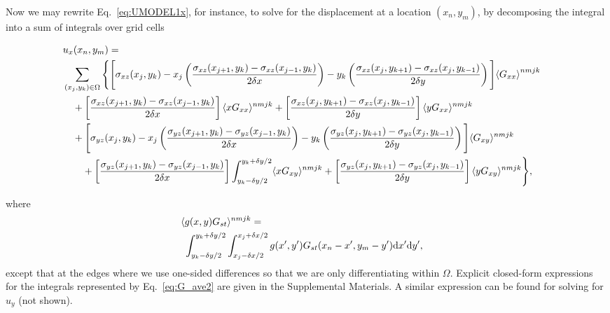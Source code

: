\documentclass[aps,prl,reprint,twocolumn,groupedaddress,showpacs]{revtex4-1}
\def\dd{\mbox{d}}
\begin{document}
Now we may rewrite Eq.~\ref{eq:UMODEL1x}, for instance, to solve for the displacement at a location $(x_n,y_m)$, by decomposing the integral into a sum of integrals over grid cells
%
\begin{widetext}
\begin{align}
 \lefteqn{u_x(x_n,y_m) =} \nonumber\\
 & \sum_{(x_j,y_k)\in\Omega} \Bigg\{ \Bigg[\sigma_{xz}(x_j,y_k)  - x_j\left(\frac{\sigma_{xz}(x_{j+1},y_k) - \sigma_{xz}(x_{j-1},y_k) }{2\delta x }    \right)    -y_k\left( \frac{\sigma_{xz}(x_j,y_{k+1}) -  \sigma_{xz}(x_j,y_{k-1}) }{2\delta y}\right) \Bigg]{ \langle G_{xx} \rangle}^{nmjk} \nonumber \\
&\quad+\left[ \frac{\sigma_{xz}(x_{j+1},y_k) -  \sigma_{xz}(x_{j-1},y_k) }{2\delta x}   \right]\langle xG_{xx} \rangle^{nmjk} + \left[  \frac{\sigma_{xz}(x_j,y_{k+1}) - \sigma_{xz}(x_j,y_{k-1}) }{2\delta y} \right] \langle yG_{xx} \rangle^{nmjk}\nonumber\\
&\quad+  \Bigg[\sigma_{yz}(x_j,y_k) -x_j\left(\frac{\sigma_{yz}(x_{j+1},y_k) - \sigma_{yz}(x_{j-1},y_k) }{2\delta x}    \right)    -y_k\left( \frac{\sigma_{yz}(x_j,y_{k+1}) - \sigma_{yz}(x_j,y_{k-1}) }{2\delta y}\right) \Bigg] \langle G_{xy} \rangle^{nmjk}\nonumber \\
&\qquad +\left[ \frac{\sigma_{yz}(x_{j+1},y_k) -  \sigma_{yz}(x_{j-1},y_k) }{2\delta x}   \right]  \int_{y_k-\delta y/2}^{y_k+\delta y/2}  \langle xG_{xy} \rangle^{nmjk} + \left[  \frac{\sigma_{yz}(x_j,y_{k+1}) - \sigma_{yz}(x_j,y_{k-1}) }{2\delta y} \right] \langle yG_{xy} \rangle^{nmjk} \Bigg\},
\label{eq:ux_decomposed}
\end{align}
\end{widetext}
where
\begin{align}
\lefteqn{\langle g(x,y)G_{st} \rangle^{nmjk} =}  \nonumber\\
&\  \int_{y_k-\delta y/2}^{y_k+\delta y/2} \int_{x_j-\delta x/2}^{x_j+\delta x/2} g(x',y')G_{st}(x_n-x',y_m-y') \dd x' \dd y', \label{eq:G_ave2} 
\end{align}
except that at the edges where we use one-sided differences so that we are only differentiating within $\Omega$. Explicit 
closed-form expressions for the integrals represented by Eq.~\ref{eq:G_ave2} are given in the Supplemental Materials. A similar expression can be found for solving for $u_y$ (not shown).
\end{document}
